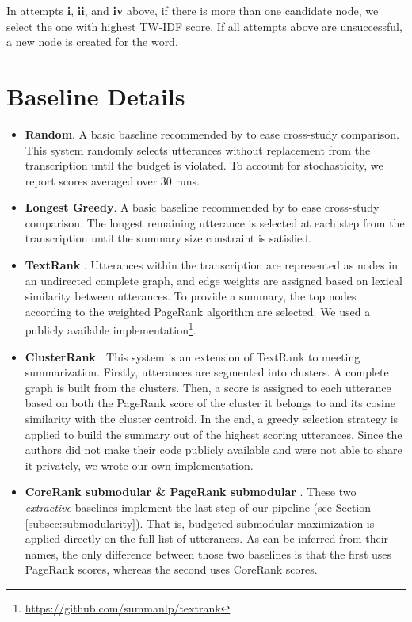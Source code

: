\documentclass[11pt,a4paper]{article}
\begin{document}
\noindent In attempts \textbf{i}, \textbf{ii}, and \textbf{iv} above, if there is more than one candidate node, we select the one with highest TW-IDF score. If all attempts above are unsuccessful, a new node is created for the word.

\section{Baseline Details}\label{app:baselines}

\begin{itemize}[leftmargin=*]
\setlength\itemsep{0em}
\item \textbf{Random}. A basic baseline recommended by \cite{riedhammer2008packing} to ease cross-study comparison. This system randomly selects utterances without replacement from the transcription until the budget is violated. To account for stochasticity, we report scores averaged over 30 runs.

\item \textbf{Longest Greedy}. A basic baseline recommended by \cite{riedhammer2008packing} to ease cross-study comparison. The longest remaining utterance is selected at each step from the transcription until the summary size constraint is satisfied.

\item \textbf{TextRank} \cite{mihalcea2004textrank}. Utterances within the transcription are represented as nodes in an undirected complete graph, and edge weights are assigned based on lexical similarity between utterances. To provide a summary, the top nodes according to the weighted PageRank algorithm \cite{page1999pagerank} are selected. We used a publicly available implementation\footnote{\url{https://github.com/summanlp/textrank}}.

\item \textbf{ClusterRank} \cite{garg2009clusterrank}. This system is an extension of TextRank to meeting summarization. Firstly, utterances are segmented into clusters. A complete graph is built from the clusters. Then, a score is assigned to each utterance based on both the PageRank score of the cluster it belongs to and its cosine similarity with the cluster centroid. In the end, a greedy selection strategy is applied to build the summary out of the highest scoring utterances. Since the authors did not make their code publicly available and were not able to share it privately, we wrote our own implementation.

\item \textbf{CoreRank submodular \& PageRank submodular} \cite{tixier2017combining}. These two \textit{extractive} baselines implement the last step of our pipeline (see Section \ref{subsec:submodularity}). That is, budgeted submodular maximization is applied directly on the full list of utterances. As can be inferred from their names, the only difference between those two baselines is that the first uses PageRank scores, whereas the second uses CoreRank scores.


\end{itemize}
\end{document}
